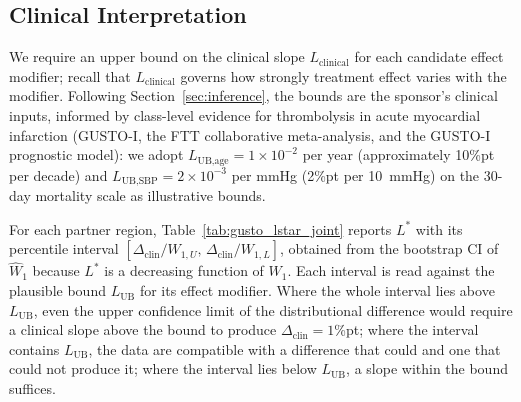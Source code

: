 \documentclass[AMA,Times1COL]{WileyNJDv5}
\begin{document}
\subsection{Clinical Interpretation}\label{sec:app_clinical}

We require an upper bound on the clinical slope $L_{\text{clinical}}$ for each candidate effect modifier; recall that $L_{\text{clinical}}$ governs how strongly treatment effect varies with the modifier. Following Section~\ref{sec:inference}, the bounds are the sponsor's clinical inputs, informed by class-level evidence for thrombolysis in acute myocardial infarction (GUSTO-I,\cite{gusto1993} the FTT collaborative meta-analysis,\cite{ftt1994} and the GUSTO-I prognostic model\cite{lee1995}): we adopt $L_{\text{UB,age}} = 1\times10^{-2}$ per year (approximately 10\%pt per decade) and $L_{\text{UB,SBP}} = 2\times10^{-3}$ per mmHg (2\%pt per 10~mmHg) on the 30-day mortality scale as illustrative bounds.

For each partner region, Table~\ref{tab:gusto_lstar_joint} reports $L^*$ with its percentile interval $[\Delta_{\text{clin}}/W_{1,U},\, \Delta_{\text{clin}}/W_{1,L}]$, obtained from the bootstrap CI of $\widehat{W}_1$ because $L^*$ is a decreasing function of $W_1$. Each interval is read against the plausible bound $L_{\text{UB}}$ for its effect modifier. Where the whole interval lies above $L_{\text{UB}}$, even the upper confidence limit of the distributional difference would require a clinical slope above the bound to produce $\Delta_{\text{clin}} = 1$\%pt; where the interval contains $L_{\text{UB}}$, the data are compatible with a difference that could and one that could not produce it; where the interval lies below $L_{\text{UB}}$, a slope within the bound suffices.
\end{document}
